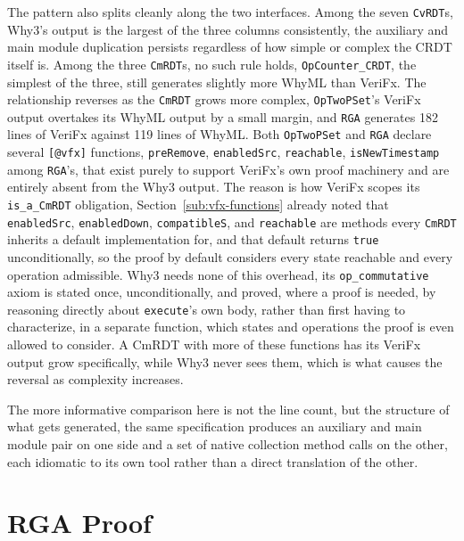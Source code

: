 The pattern also splits cleanly along the two interfaces. Among the seven \texttt{CvRDT}s, Why3's output is the largest
of the three columns consistently, the auxiliary and main module duplication persists regardless of how simple or complex
the CRDT itself is. Among the three \texttt{CmRDT}s, no such rule holds, \texttt{OpCounter\_CRDT}, the simplest of the
three, still generates slightly more WhyML than VeriFx. The relationship reverses as the \texttt{CmRDT} grows more complex,
\texttt{OpTwoPSet}'s VeriFx output overtakes its WhyML output by a small margin, and \texttt{RGA} generates 182 lines of
VeriFx against 119 lines of WhyML. Both \texttt{OpTwoPSet} and \texttt{RGA} declare several \texttt{[@vfx]} functions,
\texttt{preRemove}, \texttt{enabledSrc}, \texttt{reachable}, \texttt{isNewTimestamp} among \texttt{RGA}'s, that exist
purely to support VeriFx's own proof machinery and are entirely absent from the Why3 output. The reason is how VeriFx
scopes its \texttt{is\_a\_CmRDT} obligation, Section~\ref{sub:vfx-functions} already noted that \texttt{enabledSrc},
\texttt{enabledDown}, \texttt{compatibleS}, and \texttt{reachable} are methods every \texttt{CmRDT} inherits a default
implementation for, and that default returns \texttt{true} unconditionally, so the proof by default considers every state
reachable and every operation admissible. Why3 needs none of this overhead, its \texttt{op\_commutative} axiom is stated
once, unconditionally, and proved, where a proof is needed, by reasoning directly about \texttt{execute}'s own body,
rather than first having to characterize, in a separate function, which states and operations the proof is even allowed to
consider. A CmRDT with more of these functions has its VeriFx output grow specifically, while Why3 never sees them, which
is what causes the reversal as complexity increases.

The more informative comparison here is not the line count, but the structure of what gets generated, the same
specification produces an auxiliary and main module pair on one side and a set of native collection method calls on the
other, each idiomatic to its own tool rather than a direct translation of the other.

\section{RGA Proof}
\label{sec:rga-proof}

